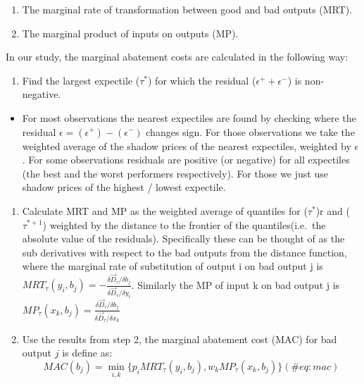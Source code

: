 \documentclass[
  10pt,
]{article}
\providecommand{\tightlist}{%
  \setlength{\itemsep}{0pt}\setlength{\parskip}{0pt}}
\begin{document}
\begin{enumerate}
\def\labelenumi{\arabic{enumi}.}
\tightlist
\item
  The marginal rate of transformation between good and bad outputs
  (MRT).\\
\item
  The marginal product of inputs on outputs (MP).
\end{enumerate}

In our study, the marginal abatement costs are calculated in the
following way:

\begin{enumerate}
\def\labelenumi{\arabic{enumi}.}
\tightlist
\item
  Find the largest expectile (\(\tau^{*}\)) for which the residual
  (\(\epsilon^+ + \epsilon^-\)) is non-negative.\\
\end{enumerate}

\begin{itemize}
\tightlist
\item
  For most observations the nearest expectiles are found by checking
  where the residual \(\epsilon = (\epsilon^+) - (\epsilon^-)\) changes
  sign. For those observations we take the weighted average of the
  shadow prices of the nearest expectiles, weighted by \(\epsilon\). For
  some observations residuals are positive (or negative) for all
  expectiles (the best and the worst performers respectively). For those
  we just use shadow prices of the highest / lowest expectile.
\end{itemize}

\begin{enumerate}
\def\labelenumi{\arabic{enumi}.}
\setcounter{enumi}{1}
\item
  Calculate MRT and MP as the weighted average of quantiles for
  (\(\tau^{*}\))r and (\(\tau^{*+1}\)) weighted by the distance to the
  frontier of the quantiles(i.e.~the absolute value of the residuals).
  Specifically these can be thought of as the sub derivatives with
  respect to the bad outputs from the distance function, where the
  marginal rate of substitution of output i on bad output j is
  \(MRT_{\tau}(y_{i},b_{j})=-\frac{\delta \vec{D}_{\tau}/\delta b_{j}}{\delta \vec{D}_{\tau}/\delta y_{i}}\).
  Similarly the MP of input k on bad output j is
  \(MP_{\tau}(x_{k},b_{j})=\frac{\delta \vec{D}_{\tau}/\delta b_{j}}{\delta \vec{D}_{\tau}/\delta x_{k}}\)
\item
  Use the results from step 2, the marginal abatement cost (MAC) for bad
  output \(j\) is define as: \begin{equation}
  MAC(b_{j})=\displaystyle \min_{i,k}\{p_{i}MRT_{\tau}(y_{i},b_{j}), w_{k}MP_{\tau}(x_{k},b_{j})\}
  (\#eq:mac)
  \end{equation}
\end{enumerate}
\end{document}
